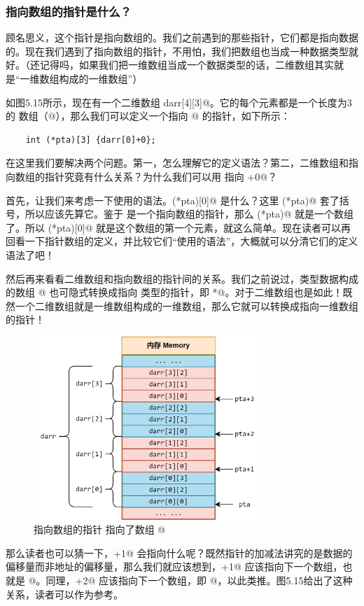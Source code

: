 \subsubsection*{指向数组的指针是什么？}
顾名思义，这个指针是指向数组的。我们之前遇到的那些指针，它们都是指向数据的。现在我们遇到了指向数组的指针，不用怕，我们把数组也当成一种数据类型就好。（还记得吗，如果我们把一维数组当成一个数据类型的话，二维数组其实就是``一维数组构成的一维数组''）\par
如图5.15所示，现在有一个二维数组 \lstinline@int darr[4][3]@。它的每个元素都是一个长度为3的 \lstinline@int@ 数组（\lstinline@int[3]@），那么我们可以定义一个指向 \lstinline@darr[0]@ 的指针，如下所示：
\begin{lstlisting}
    int (*pta)[3] {darr[0]+0};
\end{lstlisting}
在这里我们要解决两个问题。第一，怎么理解它的定义语法？第二，二维数组和指向数组的指针究竟有什么关系？为什么我们可以用 \lstinline@pta@ 指向 \lstinline@darr[0]+0@？\par
首先，让我们来考虑一下使用的语法。\lstinline@(*pta)[0]@ 是什么？这里 \lstinline@(*pta)@ 套了括号，所以应该先算它。鉴于 \lstinline@pta@ 是一个指向数组的指针，那么 \lstinline@(*pta)@ 就是一个数组了。所以 \lstinline@(*pta)[0]@ 就是这个数组的第一个元素，就这么简单。现在读者可以再回看一下指针数组的定义，并比较它们``使用的语法''，大概就可以分清它们的定义语法了吧！\par
然后再来看看二维数组和指向数组的指针间的关系。我们之前说过，\lstinline@T@ 类型数据构成的数组 \lstinline@T[N]@ 也可隐式转换成指向 \lstinline@T@ 类型的指针，即 \lstinline@T*@。对于二维数组也是如此！既然一个二维数组就是一维数组构成的一维数组，那么它就可以转换成指向一维数组的指针！\par
\begin{figure}[htbp]
    \centering
    \includegraphics[width=0.75\textwidth]{../images/generalized_parts/05_the_pointer_to_array_and_2d_array.drawio.png}
    \caption{指向数组的指针 \lstinline@pta@ 指向了数组 \lstinline@darr[0]@}
\end{figure}
那么读者也可以猜一下，\lstinline@pta+1@ 会指向什么呢？既然指针的加减法讲究的是数据的偏移量而非地址的偏移量，那么我们就应该想到，\lstinline@pta+1@ 应该指向下一个数组，也就是 \lstinline@darr[1]@。同理，\lstinline@pta+2@ 应该指向下一个数组，即 \lstinline@darr[2]@，以此类推。图5.15给出了这种关系，读者可以作为参考。\par
